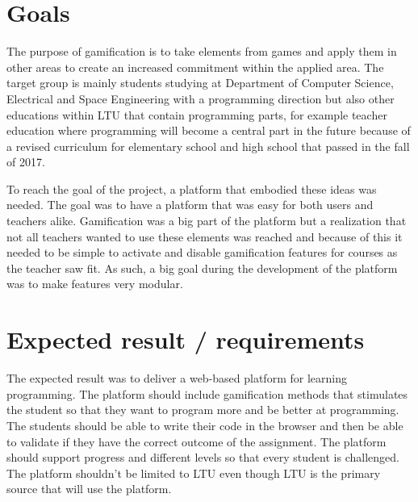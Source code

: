 



\section{Goals}   

The purpose of gamification is to take elements from games and apply them in other areas to create an increased commitment within the applied area.
The target group is mainly students studying at Department of Computer Science, Electrical and Space Engineering  with a programming direction but also other educations within LTU that contain programming parts, for example teacher education where programming will become a central part in the future because of a revised curriculum for elementary school and high school that passed in the fall of 2017.

To reach the goal of the project, a platform that embodied these ideas was needed.
The goal was to have a platform that was easy for both users and teachers alike. Gamification was a big part of the platform but a realization that not all teachers wanted to use these elements was reached and because of this it needed to be simple to activate and disable gamification features for courses as the teacher saw fit. As such, a big goal during the development of the platform was to make features very modular.

\section{Expected result / requirements}  
The expected result was to deliver a web-based platform for learning programming. The platform should include gamification methods that stimulates the student so that they want to program more and be better at programming. The students should be able to write their code in the browser and then be able to validate if they have the correct outcome of the assignment. The platform should support progress and different levels so that every student is challenged. The platform shouldn't be limited to LTU even though LTU is the primary source that will use the platform. 

